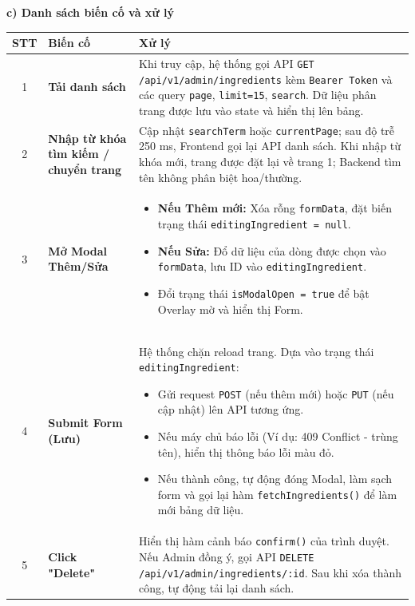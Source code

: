 \documentclass[12pt,a4paper]{article}
\begin{document}
\textbf{c) Danh sách biến cố và xử lý}

\begin{center}
\renewcommand{\arraystretch}{1.5}
\begin{tabularx}{\textwidth}{|c|l|X|}
\hline
\rowcolor{blue!20}
\textbf{STT} & \textbf{Biến cố} & \textbf{Xử lý} \\ \hline

1 & \textbf{Tải danh sách} & Khi truy cập, hệ thống gọi API \texttt{GET /api/v1/admin/ingredients} kèm \texttt{Bearer Token} và các query \texttt{page}, \texttt{limit=15}, \texttt{search}. Dữ liệu phân trang được lưu vào state và hiển thị lên bảng. \\ \hline

2 & \textbf{Nhập từ khóa tìm kiếm / chuyển trang} & Cập nhật \texttt{searchTerm} hoặc \texttt{currentPage}; sau độ trễ 250 ms, Frontend gọi lại API danh sách. Khi nhập từ khóa mới, trang được đặt lại về trang 1; Backend tìm tên không phân biệt hoa/thường. \\ \hline

3 & \textbf{Mở Modal Thêm/Sửa} & 
\begin{itemize}
    \item \textbf{Nếu Thêm mới:} Xóa rỗng \texttt{formData}, đặt biến trạng thái \texttt{editingIngredient = null}.
    \item \textbf{Nếu Sửa:} Đổ dữ liệu của dòng được chọn vào \texttt{formData}, lưu ID vào \texttt{editingIngredient}.
    \item Đổi trạng thái \texttt{isModalOpen = true} để bật Overlay mờ và hiển thị Form.
\end{itemize} \\ \hline

4 & \textbf{Submit Form (Lưu)} & 
Hệ thống chặn reload trang. Dựa vào trạng thái \texttt{editingIngredient}:
\begin{itemize}
    \item Gửi request \texttt{POST} (nếu thêm mới) hoặc \texttt{PUT} (nếu cập nhật) lên API tương ứng.
    \item Nếu máy chủ báo lỗi (Ví dụ: 409 Conflict - trùng tên), hiển thị thông báo lỗi màu đỏ.
    \item Nếu thành công, tự động đóng Modal, làm sạch form và gọi lại hàm \texttt{fetchIngredients()} để làm mới bảng dữ liệu.
\end{itemize} \\ \hline

5 & \textbf{Click "Delete"} & Hiển thị hàm cảnh báo \texttt{confirm()} của trình duyệt. Nếu Admin đồng ý, gọi API \texttt{DELETE /api/v1/admin/ingredients/:id}. Sau khi xóa thành công, tự động tải lại danh sách. \\ \hline

\end{tabularx}
\end{center}
\end{document}
